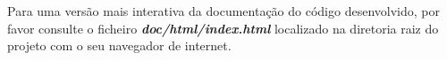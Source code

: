 \documentclass[a4paper,11pt]{scrreprt}
\begin{document}






%


    \quad Para uma versão mais interativa da documentação do código desenvolvido, por favor consulte o
    ficheiro \textbf{\textit{doc/html/index.html}} localizado na diretoria raiz do projeto com o seu
    navegador de internet.


\end{document}

